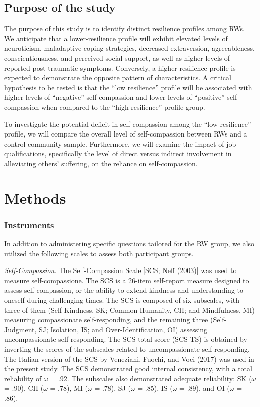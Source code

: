 \documentclass[
  man]{apa7}
\begin{document}
\hypertarget{purpose-of-the-study}{%
\subsection{Purpose of the study}\label{purpose-of-the-study}}

The purpose of this study is to identify distinct resilience profiles among RWs. We anticipate that a lower-resilience profile will exhibit elevated levels of neuroticism, maladaptive coping strategies, decreased extraversion, agreeableness, conscientiousness, and perceived social support, as well as higher levels of reported post-traumatic symptoms. Conversely, a higher-resilience profile is expected to demonstrate the opposite pattern of characteristics. A critical hypothesis to be tested is that the ``low resilience'' profile will be associated with higher levels of ``negative'' self-compassion and lower levels of ``positive'' self-compassion when compared to the ``high resilience'' profile group.

To investigate the potential deficit in self-compassion among the ``low resilience'' profile, we will compare the overall level of self-compassion between RWs and a control community sample. Furthermore, we will examine the impact of job qualifications, specifically the level of direct versus indirect involvement in alleviating others' suffering, on the reliance on self-compassion.

\hypertarget{methods}{%
\section{Methods}\label{methods}}

\hypertarget{instruments}{%
\subsubsection{Instruments}\label{instruments}}

In addition to administering specific questions tailored for the RW group, we also utilized the following scales to assess both participant groups.

\emph{Self-Compassion}. The Self-Compassion Scale {[}SCS; Neff (2003){]} was used to measure self-compassione. The SCS is a 26-item self-report measure designed to assess self-compassion, or the ability to extend kindness and understanding to oneself during challenging times. The SCS is composed of six subscales, with three of them (Self-Kindness, SK; Common-Humanity, CH; and Mindfulness, MI) measuring compassionate self-responding, and the remaining three (Self-Judgment, SJ; Isolation, IS; and Over-Identification, OI) assessing uncompassionate self-responding. The SCS total score (SCS-TS) is obtained by inverting the scores of the subscales related to uncompassionate self-responding. The Italian version of the SCS by Veneziani, Fuochi, and Voci (2017) was used in the present study. The SCS demonstrated good internal consistency, with a total reliability of \(\omega\) = .92. The subscales also demonstrated adequate reliability: SK (\(\omega\) = .90), CH (\(\omega\) = .78), MI (\(\omega\) = .78), SJ (\(\omega\) = .85), IS (\(\omega\) = .89), and OI (\(\omega\) = .86).
\end{document}
